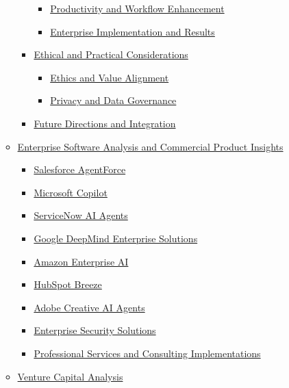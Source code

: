 \documentclass[
]{article}
\providecommand{\tightlist}{%
  \setlength{\itemsep}{0pt}\setlength{\parskip}{0pt}}
\begin{document}
\begin{itemize}
\begin{itemize}
\begin{itemize}
      \begin{itemize}
      \tightlist
      \item
        \hyperref[productivity-and-workflow-enhancement]{Productivity
        and Workflow Enhancement}
      \item
        \hyperref[enterprise-implementation-and-results]{Enterprise
        Implementation and Results}
      \end{itemize}
    \item
      \hyperref[ethical-and-practical-considerations]{Ethical and
      Practical Considerations}

      \begin{itemize}
      \tightlist
      \item
        \hyperref[ethics-and-value-alignment]{Ethics and Value
        Alignment}
      \item
        \hyperref[privacy-and-data-governance]{Privacy and Data
        Governance}
      \end{itemize}
    \item
      \hyperref[future-directions-and-integration]{Future Directions and
      Integration}
    \end{itemize}
  \item
    \hyperref[enterprise-software-analysis-and-commercial-product-insights]{Enterprise
    Software Analysis and Commercial Product Insights}

    \begin{itemize}
    \tightlist
    \item
      \hyperref[salesforce-agentforce]{Salesforce AgentForce}
    \item
      \hyperref[microsoft-copilot]{Microsoft Copilot}
    \item
      \hyperref[servicenow-ai-agents]{ServiceNow AI Agents}
    \item
      \hyperref[google-deepmind-enterprise-solutions]{Google DeepMind
      Enterprise Solutions}
    \item
      \hyperref[amazon-enterprise-ai]{Amazon Enterprise AI}
    \item
      \hyperref[hubspot-breeze]{HubSpot Breeze}
    \item
      \hyperref[adobe-creative-ai-agents]{Adobe Creative AI Agents}
    \item
      \hyperref[enterprise-security-solutions]{Enterprise Security
      Solutions}
    \item
      \hyperref[professional-services-and-consulting-implementations]{Professional
      Services and Consulting Implementations}
    \end{itemize}
  \item
    \hyperref[venture-capital-analysis]{Venture Capital Analysis}


\end{itemize}
\end{itemize}
\end{document}
